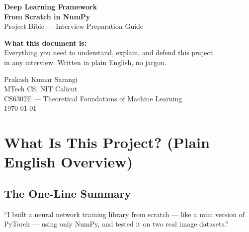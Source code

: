 \documentclass[12pt, a4paper]{article}
\begin{document}

\begin{titlepage}
  \centering
  \vspace*{2cm}
  {\Huge\bfseries\color{primaryblue} Deep Learning Framework}\\[0.5em]
  {\Huge\bfseries\color{primaryblue} From Scratch in NumPy}\\[1.5em]
  {\large\color{darkgray} Project Bible --- Interview Preparation Guide}\\[3em]
  \begin{tcolorbox}[colback=lightblue, colframe=primaryblue, width=0.85\textwidth, arc=6pt]
    \centering\large
    \textbf{What this document is:}\\[0.5em]
    Everything you need to understand, explain, and defend this project\\
    in any interview. Written in plain English, no jargon.
  \end{tcolorbox}
  \vfill
  {\large Prakash Kumar Sarangi}\\
  {\normalsize MTech CS, NIT Calicut}\\[0.5em]
  {\normalsize CS6302E --- Theoretical Foundations of Machine Learning}\\[2em]
  {\normalsize \today}
\end{titlepage}

\tableofcontents
\newpage

\section{What Is This Project? (Plain English Overview)}

\subsection{The One-Line Summary}

\begin{tcolorbox}[colback=lightblue, colframe=primaryblue, arc=4pt]
  \centering\large
  ``I built a neural network training library from scratch --- like a mini version of PyTorch ---
  using only NumPy, and tested it on two real image datasets.''
\end{tcolorbox}
\end{document}
